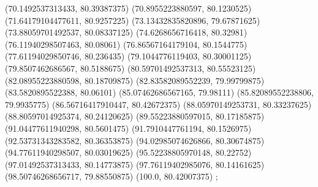 {{{		(70.1492537313433, 80.39387375)
		(70.8955223880597, 80.1230525)
		(71.64179104477611, 80.9257225)
		(73.13432835820896, 79.67871625)
		(73.88059701492537, 80.08337125)
		(74.6268656716418, 80.32981)
		(76.11940298507463, 80.08061)
		(76.86567164179104, 80.1544775)
		(77.61194029850746, 80.236435)
		(79.1044776119403, 80.30001125)
		(79.8507462686567, 80.5188675)
		(80.59701492537313, 80.55523125)
		(82.08955223880598, 80.18709875)
		(82.83582089552239, 79.99799875)
		(83.5820895522388, 80.06101)
		(85.07462686567165, 79.98111)
		(85.82089552238806, 79.9935775)
		(86.56716417910447, 80.42672375)
		(88.05970149253731, 80.33237625)
		(88.80597014925374, 80.24120625)
		(89.55223880597015, 80.17185875)
		(91.04477611940298, 80.5601475)
		(91.7910447761194, 80.1526975)
		(92.53731343283582, 80.36353875)
		(94.02985074626866, 80.30674875)
		(94.77611940298507, 80.03019625)
		(95.52238805970148, 80.22752)
		(97.01492537313433, 80.14773875)
		(97.76119402985076, 80.14161625)
		(98.50746268656717, 79.88550875)
		(100.0, 80.42007375)
	};

}}
